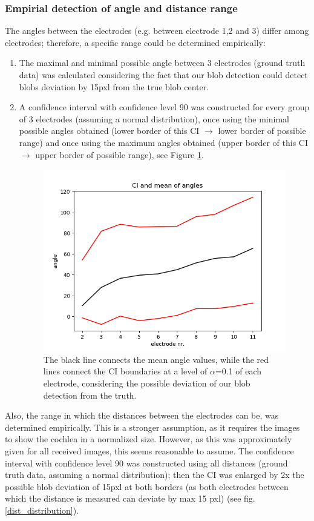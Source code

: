 \documentclass[a4paper, 10pt, twocolumn]{article}
\begin{document}
\subsubsection{Empirial detection of angle and distance range}
The angles between the electrodes (e.g. between electrode 1,2 and 3) differ among electrodes; therefore, a specific range could be determined empirically: 
\begin{enumerate}
\item The maximal and minimal possible angle between 3 electrodes (ground truth data) was calculated considering the fact that our blob detection could detect blobs deviation by 15pxl from the true blob center. 
\item A confidence interval with confidence level 90 was constructed for every group of 3 electrodes (assuming a normal distribution), once using the minimal possible angles obtained (lower border of this CI $\rightarrow$ lower border of possible range) and once using the maximum angles obtained (upper border of this CI $\rightarrow$ upper border of possible range), see Figure \ref{mean_angles}.
\begin{figure}[ht]
	\centering
  \includegraphics[width=.5\textwidth]{CI_and_mean_of_angles.png}
	\caption{The black line connects the mean angle values, while the red lines connect the CI boundaries at a level of $\alpha$=0.1 of each electrode, considering the possible deviation of our blob detection from the truth.} %
	\label{mean_angles}
\end{figure}
\end{enumerate}
Also, the range in which the distances between the electrodes can be, was determined empirically. This is a stronger assumption, as it requires the images to show the cochlea in a normalized size. However, as this was approximately given for all received images, this seems reasonable to assume. The confidence interval with confidence level 90 was constructed using all distances (ground truth data, assuming a normal distribution); then the CI was enlarged by 2x the possible blob deviation of 15pxl at both borders (as both electrodes between which the distance is measured can deviate by max 15 pxl) (see fig. \ref{dist_distribution}). 
\end{document}
